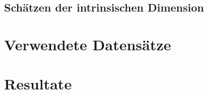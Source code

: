 \subsection{Schätzen der intrinsischen Dimension}
\label{ch:Vergleich:sec:Methodik:subsec:SchaetzenDerIntrinsischenDim}


\section{Verwendete Datensätze}
\label{ch:Vergleich:sec:VerwendeteDatensaetze}

\section{Resultate}
\label{ch:Vergleich:sec:Resultate}

